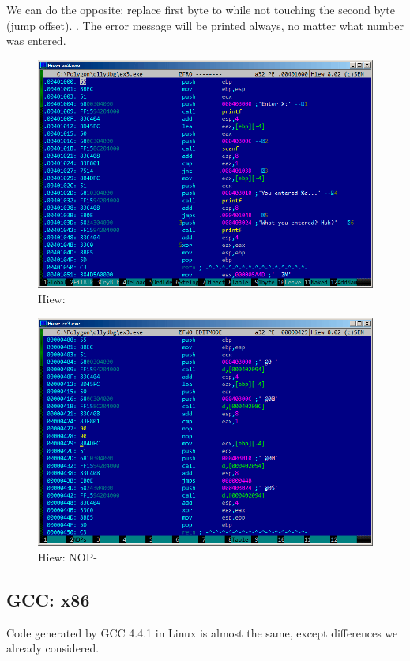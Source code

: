 {We can do the opposite: replace first byte to  while not touching the second byte (\gls{jump offset})}.
.
{The error message will be printed always, no matter what number was entered}.

\begin{figure}[H]
\centering
\includegraphics[scale=0.66]{patterns/04_scanf/ex3_hiew_1.png}
\caption{Hiew: \main{}}
\label{fig:scanf_ex3_hiew_1}
\end{figure}

\begin{figure}[H]
\centering
\includegraphics[scale=0.66]{patterns/04_scanf/ex3_hiew_2.png}
\caption{Hiew:    \ac{NOP}-}
\label{fig:scanf_ex3_hiew_2}
\end{figure}

\subsection{GCC: x86}

{Code generated by GCC 4.4.1 in Linux is almost the same, except differences we already considered.}
